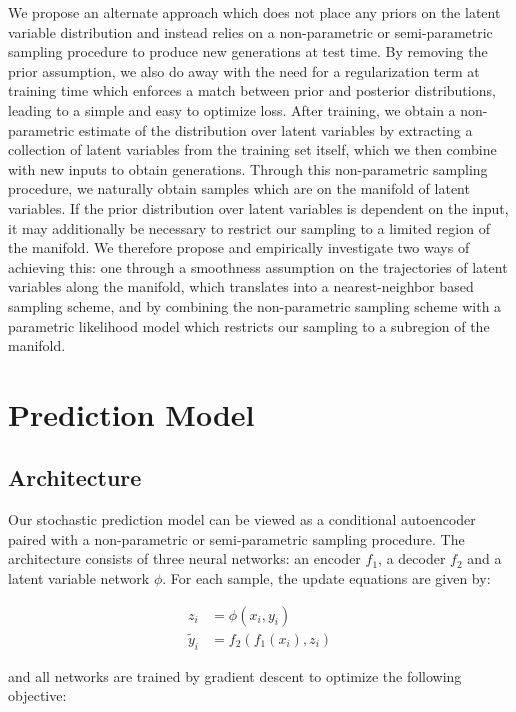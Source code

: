 \documentclass{article}
\begin{document}
We propose an alternate approach which does not place any priors on the latent variable distribution and instead relies on a non-parametric or semi-parametric sampling procedure to produce new generations at test time.
By removing the prior assumption, we also do away with the need for a regularization term at training time which enforces a match between prior and posterior distributions, leading to a simple and easy to optimize loss. After training, we obtain a non-parametric estimate of the distribution over latent variables by extracting a collection of latent variables from the training set itself, which we then combine with new inputs to obtain generations.
Through this non-parametric sampling procedure, we naturally obtain samples which are on the manifold of latent variables.
If the prior distribution over latent variables is dependent on the input, it may additionally be necessary to restrict our sampling to a limited region of the manifold.
We therefore propose and empirically investigate two ways of achieving this: one through a smoothness assumption on the trajectories of latent variables along the manifold, which translates into a nearest-neighbor based sampling scheme, and by combining the non-parametric sampling scheme with a parametric likelihood model which restricts our sampling to a subregion of the manifold.



\section{Prediction Model}

\subsection{Architecture}

Our stochastic prediction model can be viewed as a conditional autoencoder paired with a non-parametric  or semi-parametric sampling procedure.
The architecture consists of three neural networks: an encoder $f_1$, a decoder $f_2$ and a latent variable network $\phi$.
For each sample, the update equations are given by:

\begin{align*}
z_i &= \phi(x_i, y_i) \\
\tilde{y}_i &= f_2(f_1(x_i), z_i)
\end{align*}

and all networks are trained by gradient descent to optimize the following objective:
\end{document}
